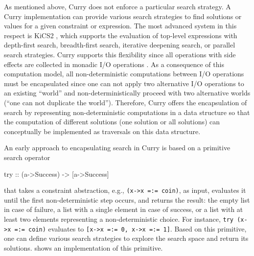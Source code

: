 \documentclass[english]{lni}
\newcommand{\code}[1]{\texttt{\small{}#1}}
\newcommand{\bs}{\char92} %
\begin{document}
As mentioned above, Curry does not enforce a particular search
strategy. A Curry implementation
can provide various search strategies to find solutions
or values for a given constraint or expression.
The most advanced system in this respect is
KiCS2 \cite{BrasselHanusPeemoellerReck11},
which supports the evaluation of top-level expressions
with depth-first search, breadth-first search,
iterative deepening search, or parallel search strategies.
Curry supports this flexibility since all operations with side effects
are collected in monadic I/O operations \cite{Wadler97}.
As a consequence of this computation model,
all non-deterministic computations between I/O operations
must be encapsulated since one can not apply two alternative
I/O operations to an existing ``world''
and non-deterministically proceed with two alternative worlds
(``one can not duplicate the world'').
Therefore, Curry offers the encapsulation of search
by representing non-deterministic computations
in a data structure so that the computation of different solutions
(one solution or all solutions) can conceptually be implemented
as traversals on this data structure.

An early approach
\cite{HanusSteiner98PLILP,Lux99FLOPS}
to encapsulating search in Curry
is based on a primitive search operator
\begin{curry}
try :: (a->Success) -> [a->Success]
\end{curry}
that takes a constraint abstraction, e.g., \code{(\bs{}x->x\,=:=\,coin)},
as input, evaluates it until the first non-deterministic step occurs,
and returns the result: the empty list in case of failure, a list with a single
element in case of success, or a list with at least two elements representing
a non-deterministic choice. For instance,
\code{try\,(\bs{}x->x\,=:=\,coin)} evaluates to
\code{[\bs{}x->x\,=:=\,0,\,\bs{}x->x\,=:=\,1]}.
Based on this primitive, one can define various search strategies
to explore the search space and return its solutions.
\cite{Lux99FLOPS} shows an implementation of this primitive.
\end{document}
